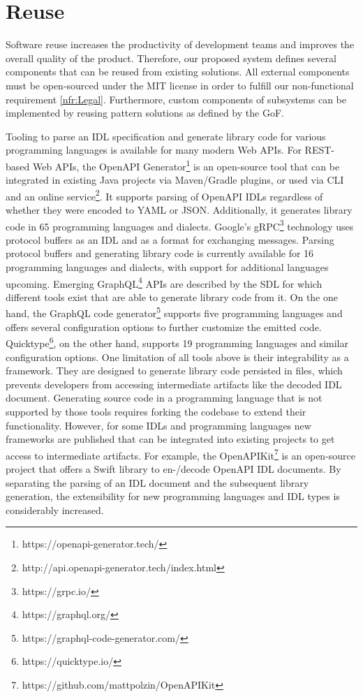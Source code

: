 \section{Reuse}
\label{sec:Reuse}

 Software reuse increases the productivity of development teams and improves the overall quality of the product. Therefore, our proposed system defines several components that can be reused from existing solutions. All external components must be open-sourced under the MIT license in order to fulfill our non-functional requirement \ref{nfr:Legal}. Furthermore, custom components of subsystems can be implemented by reusing pattern solutions as defined by the \ac{GoF}. 
 
 Tooling to parse an IDL specification and generate library code for various programming languages is available for many modern Web APIs. For REST-based Web APIs, the OpenAPI Generator\footnote{https://openapi-generator.tech/} is an open-source tool that can be integrated in existing Java projects via Maven/Gradle plugins, or used via CLI and an online service\footnote{http://api.openapi-generator.tech/index.html}. It supports parsing of OpenAPI IDLs regardless of whether they were encoded to YAML or JSON. Additionally, it generates library code in 65 programming languages and dialects. Google's gRPC\footnote{https://grpc.io/} technology uses protocol buffers as an IDL and as a format for exchanging messages. Parsing protocol buffers and generating library code is currently available for 16 programming languages and dialects, with support for additional languages upcoming. Emerging GraphQL\footnote{https://graphql.org/} APIs are described by the \ac{SDL} for which different tools exist that are able to generate library code from it. On the one hand, the GraphQL code generator\footnote{https://graphql-code-generator.com/} supports five programming languages and offers several configuration options to further customize the emitted code. Quicktype\footnote{https://quicktype.io/}, on the other hand, supports 19 programming languages and similar configuration options. One limitation of all tools above is their integrability as a framework. They are designed to generate library code persisted in files, which prevents developers from accessing intermediate artifacts like the decoded IDL document. Generating source code in a programming language that is not supported by those tools requires forking the codebase to extend their functionality. However, for some IDLs and programming languages new frameworks are published that can be integrated into existing projects to get access to intermediate artifacts. For example, the OpenAPIKit\footnote{https://github.com/mattpolzin/OpenAPIKit} is an open-source project that offers a Swift library to en-/decode OpenAPI IDL documents. By separating the parsing of an IDL document and the subsequent library generation, the extensibility for new programming languages and IDL types is considerably increased. 
 

